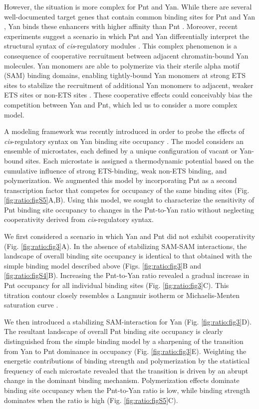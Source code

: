 However, the situation is more complex for Pnt and Yan. While there are several well-documented target genes that contain common binding sites for Pnt and Yan \cite{Halfon2000,Xu2000,Flores2000,BoisclairLachance2018}, Yan binds these enhancers with higher affinity than Pnt \cite{Xu2000}. Moreover, recent experiments suggest a scenario in which Pnt and Yan differentially interpret the structural syntax of \textit{cis}-regulatory modules \cite{BoisclairLachance2018}. This complex phenomenon is a consequence of cooperative recruitment between adjacent chromatin-bound Yan molecules. Yan monomers are able to polymerize via their sterile alpha motif (SAM) binding domains, enabling tightly-bound Yan monomers at strong ETS sites to stabilize the recruitment of additional Yan monomers to adjacent, weaker ETS sites or non-ETS sites \cite{Qiao2004,BoisclairLachance2018}. These cooperative effects could conceivably bias the competition between Yan and Pnt, which led us to consider a more complex model.

A modeling framework was recently introduced in order to probe the effects of \textit{cis}-regulatory syntax on Yan binding site occupancy \cite{Hope2017}. The model considers an ensemble of microstates, each defined by a unique configuration of vacant or Yan-bound sites. Each microstate is assigned a thermodynamic potential based on the cumulative influence of strong ETS-binding, weak non-ETS binding, and polymerization. We augmented this model by incorporating Pnt as a second transcription factor that competes for occupancy of the same binding sites (Fig. \ref{fig:ratio:figS5}A,B). Using this model, we sought to characterize the sensitivity of Pnt binding site occupancy to changes in the Pnt-to-Yan ratio without neglecting cooperativity derived from \textit{cis}-regulatory syntax.

We first considered a scenario in which Yan and Pnt did not exhibit cooperativity (Fig. \ref{fig:ratio:fig3}A). In the absence of stabilizing SAM-SAM interactions, the landscape of overall binding site occupancy is identical to that obtained with the simple binding model described above (Figs. \ref{fig:ratio:fig3}B and \ref{fig:ratio:figS4}B). Increasing the Pnt-to-Yan ratio revealed a gradual increase in Pnt occupancy for all individual binding sites (Fig. \ref{fig:ratio:fig3}C). This titration contour closely resembles a Langmuir isotherm or Michaelis-Menten saturation curve \cite{Fogler1987}.

We then introduced a stabilizing SAM-interaction for Yan (Fig. \ref{fig:ratio:fig3}D). The resultant landscape of overall Pnt binding site occupancy is clearly distinguished from the simple binding model by a sharpening of the transition from Yan to Pnt dominance in occupancy (Fig. \ref{fig:ratio:fig3}E). Weighting the energetic contributions of binding strength and polymerization by the statistical frequency of each microstate revealed that the transition is driven by an abrupt change in the dominant binding mechanism. Polymerization effects dominate binding site occupancy when the Pnt-to-Yan ratio is low, while binding strength dominates when the ratio is high (Fig. \ref{fig:ratio:figS5}C).

